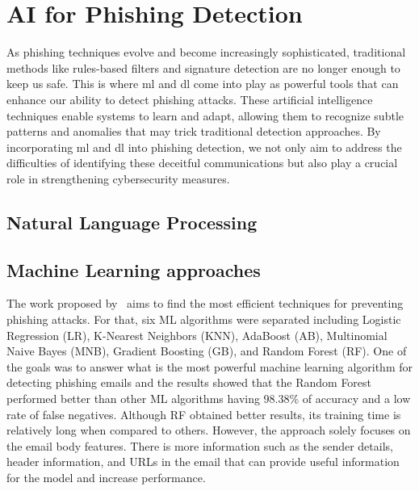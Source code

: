 
\section{AI for Phishing Detection}


As phishing techniques evolve and become increasingly sophisticated, traditional methods like rules-based filters and signature detection are no longer enough to keep us safe. This is where \ac{ml} and \ac{dl} come into play as powerful tools that can enhance our ability to detect phishing attacks. These artificial intelligence techniques enable systems to learn and adapt, allowing them to recognize subtle patterns and anomalies that may trick traditional detection approaches.
By incorporating \ac{ml} and \ac{dl} into phishing detection, we not only aim to address the difficulties of identifying these deceitful communications but also play a crucial role in strengthening cybersecurity measures.

\subsection{Natural Language Processing}


\subsection{Machine Learning approaches}


The work proposed by~\citet{rabbi2023phishy} aims to find the most efficient techniques for preventing phishing attacks. For that, six ML algorithms were separated including Logistic Regression (LR), K-Nearest Neighbors (KNN), AdaBoost (AB), Multinomial Naive Bayes (MNB), Gradient Boosting (GB), and Random Forest (RF). One of the goals was to answer what is the most powerful machine learning algorithm for detecting phishing emails and the results showed that the Random Forest performed better than other ML algorithms having 98.38\% of accuracy and a low rate of false negatives. Although RF obtained better results, its training time is relatively long when compared to others. However, the approach solely focuses on the email body features. There is more information such as the sender details, header information, and URLs in the email that can provide useful information for the model and increase performance.

